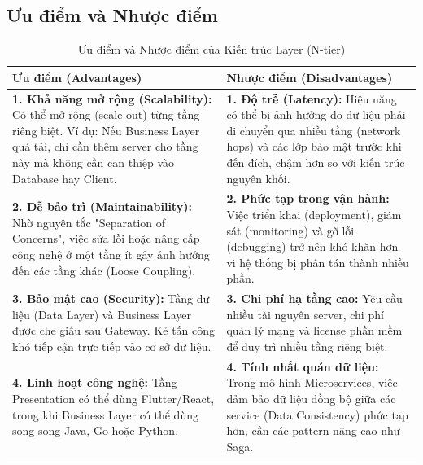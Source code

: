 \subsection{Ưu điểm và Nhược điểm}
\begin{table}[H]
    \centering
    \caption{Ưu điểm và Nhược điểm của Kiến trúc Layer (N-tier)}
    \label{tab:ntier-comparison}
    \renewcommand{\arraystretch}{1.5} %
    
    \begin{tabularx}{\textwidth}{ | >{\raggedright\arraybackslash}X | >{\raggedright\arraybackslash}X | }
        \hline
        \textbf{Ưu điểm (Advantages)} & \textbf{Nhược điểm (Disadvantages)} \\  
        \hline
        
        \textbf{1. Khả năng mở rộng (Scalability):} \newline 
        Có thể mở rộng (scale-out) từng tầng riêng biệt. Ví dụ: Nếu Business Layer quá tải, chỉ cần thêm server cho tầng này mà không cần can thiệp vào Database hay Client. 
        & 
        \textbf{1. Độ trễ (Latency):} \newline 
        Hiệu năng có thể bị ảnh hưởng do dữ liệu phải di chuyển qua nhiều tầng (network hops) và các lớp bảo mật trước khi đến đích, chậm hơn so với kiến trúc nguyên khối. \\  
        \hline
        
        \textbf{2. Dễ bảo trì (Maintainability):} \newline 
        Nhờ nguyên tắc "Separation of Concerns", việc sửa lỗi hoặc nâng cấp công nghệ ở một tầng ít gây ảnh hưởng đến các tầng khác (Loose Coupling). 
        & 
        \textbf{2. Phức tạp trong vận hành:} \newline 
        Việc triển khai (deployment), giám sát (monitoring) và gỡ lỗi (debugging) trở nên khó khăn hơn vì hệ thống bị phân tán thành nhiều phần. \\  
        \hline
        
        \textbf{3. Bảo mật cao (Security):} \newline 
        Tầng dữ liệu (Data Layer) và Business Layer được che giấu sau Gateway. Kẻ tấn công khó tiếp cận trực tiếp vào cơ sở dữ liệu. 
        & 
        \textbf{3. Chi phí hạ tầng cao:} \newline 
        Yêu cầu nhiều tài nguyên server, chi phí quản lý mạng và license phần mềm để duy trì nhiều tầng riêng biệt. \\  
        \hline
        
        \textbf{4. Linh hoạt công nghệ:} \newline 
        Tầng Presentation có thể dùng Flutter/React, trong khi Business Layer có thể dùng song song Java, Go hoặc Python. 
        & 
        \textbf{4. Tính nhất quán dữ liệu:} \newline 
        Trong mô hình Microservices, việc đảm bảo dữ liệu đồng bộ giữa các service (Data Consistency) phức tạp hơn, cần các pattern nâng cao như Saga. \\  
        \hline
    \end{tabularx}
\end{table}

